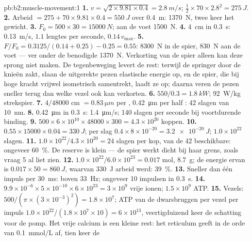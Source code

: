 \begin{solution}{pb:b2:muscle-movement:1}
\textbf{1.} $v = \sqrt{2\times 9.81\times 0.4} = \qty{2.8}{m/s}$;
$\tfrac12\times 70\times 2.8^{2} = \qty{275}{J}$.
\textbf{2.} Arbeid $= 275 + 70\times 9.81\times 0.4 = \qty{550}{J}$ over
\qty{0.4}{m}: \qty{1370}{N}, twee keer het gewicht.
\textbf{3.} $F_0 = 500\times 30 = \qty{15000}{N}$; aan de voet
\qty{1500}{N}.
\textbf{4.} \qty{4}{cm} in \qty{0.3}{s}: \qty{0.13}{m/s}, $1.1$ lengtes per
seconde, $0.14\,v_{\max}$.
\textbf{5.} $F/F_0 = 0.3125/(0.14 + 0.25) - 0.25 = 0.55$: \qty{8300}{N}
in de spier, \qty{830}{N} aan de voet --- ver onder de benodigde
\qty{1370}{N}. Verkorting van de spier alleen kan deze sprong niet maken.
De tegenbeweging levert de rest: terwijl de springer door de knieën zakt,
slaan de uitgerekte pezen elastische energie op, en de spier, die bij hoge
kracht vrijwel isometrisch samentrekt, laadt ze op; daarna veren de pezen
sneller terug dan welke vezel ook kan verkorten.
\textbf{6.} $550/0.3 = \qty{1.8}{kW}$; \qty{92}{W/kg} strekspier.
\textbf{7.} $4/\num{48000}$ cm $= \qty{0.83}{\micro m}$ per ,
\qty{0.42}{\micro m} per half : 42 slagen van \qty{10}{nm}.
\textbf{8.} \qty{0.42}{\micro m} in \qty{0.3}{s}: \qty{1.4}{\micro m/s};
140 slagen per seconde bij voortdurende binding.
\textbf{9.} $500\times 6\times 10^{10}\times \num{48000}\times 300 =
4.3\times 10^{20}$ koppen.
\textbf{10.} $0.55\times \num{15000}\times 0.04 = \qty{330}{J}$; per
slag $0.4\times 8\times 10^{-20} = \qty{3.2e-20}{J}$; $1.0\times
10^{22}$ slagen.
\textbf{11.} $1.0\times 10^{22}/4.3\times 10^{20} = 24$ slagen per
kop, van de 42 beschikbare: ongeveer \qty{60}{\%}. De reserve is
klein --- de spier werkt dicht bij haar grens, zoals vraag 5 al liet zien.
\textbf{12.} $1.0\times 10^{22}/6.0\times 10^{23} = 0.017$ mol,
\qty{8.7}{g}; de energie ervan is $0.017\times 50 = \qty{860}{J}$, waarvan
\qty{330}{J} arbeid werd: \qty{39}{\%}.
\textbf{13.} Sneller dan één impuls per \qty{30}{ms}: boven
\qty{33}{Hz}; ongeveer 10 impulsen in \qty{0.3}{s}.
\textbf{14.} $9.9\times 10^{-6}\times 5\times 10^{-10}\times 6\times
10^{23} = 3\times 10^{9}$ vrije ionen; $1.5\times 10^{9}$ ATP.
\textbf{15.} Vezels: $500/(\pi\times(3\times 10^{-3})^{2}) = 1.8\times
10^{7}$; ATP van de dwarsbruggen per vezel per impuls $1.0\times
10^{22}/(1.8\times 10^{7}\times 10) = 6\times 10^{13}$, veertigduizend
keer de schatting voor de pomp. Het vrije calcium is een kleine rest: het
reticulum geeft in de orde van \qty{0.1}{mmol/L} af, tien keer de

\end{solution}
